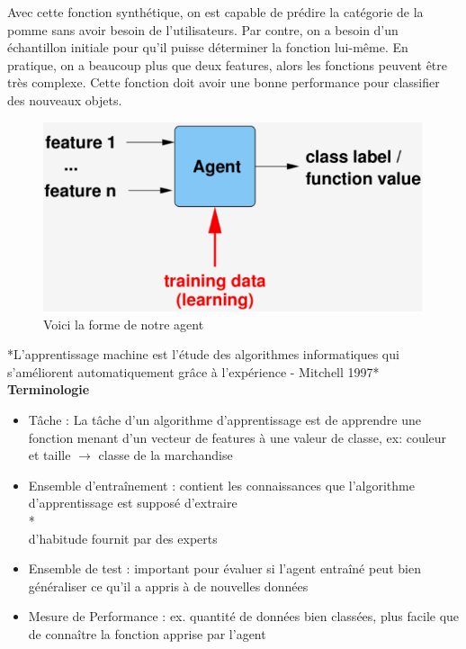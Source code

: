 \documentclass[oneside]{book}
\begin{document}
Avec cette fonction synthétique, on est capable de prédire la catégorie de la pomme sans avoir besoin de l'utilisateurs. Par contre, on a besoin d'un échantillon initiale pour qu'il puisse déterminer la fonction lui-même. En pratique, on a beaucoup plus que deux features, alors les fonctions peuvent être très complexe. Cette fonction doit avoir une bonne performance pour classifier des nouveaux objets.\\

\begin{figure}[!ht]
\centering
\includegraphics[width= \linewidth]{Classifier_Agent.png}
\caption{Voici la forme de notre agent}
\label{fig:Classifier_Agent}
\end{figure}

*L’apprentissage machine est l’étude des algorithmes informatiques
qui s’améliorent automatiquement grâce à l’expérience - Mitchell 1997*\\

\textbf{Terminologie}
\begin{itemize}
\item Tâche : La tâche d’un algorithme d’apprentissage est de
apprendre une fonction menant d’un vecteur de
features à une valeur de classe, ex: couleur et taille $\rightarrow$ classe de la marchandise
\item Ensemble d'entraînement : contient les connaissances que
l’algorithme d’apprentissage est supposé d’extraire\\
*\\
d’habitude fournit par des experts
\item Ensemble de test : important pour évaluer si l’agent entraîné
peut bien généraliser ce qu’il a appris à de nouvelles
données
\item Mesure de Performance : ex. quantité de données bien classées, plus facile que de connaître la fonction apprise
par l’agent
\end{itemize}
\end{document}
